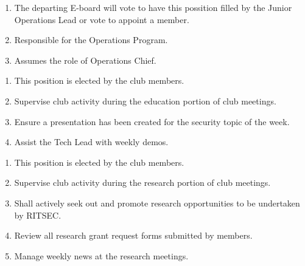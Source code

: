 \begin{enumerate}
	\item The departing E-board will vote to have this possition filled by the Junior Operations Lead or vote to appoint a member.
	\item Responsible for the Operations Program.
	\item Assumes the role of Operations Chief.
\end{enumerate}


\begin{enumerate}
	\item This position is elected by the club members.
	\item Supervise club activity during the education portion of club meetings.
	\item Ensure a presentation has been created for the security topic of the week.
	\item Assist the Tech Lead with weekly demos.
\end{enumerate}


\begin{enumerate}
	\item This position is elected by the club members.
	\item Supervise club activity during the research portion of club meetings.
	\item Shall actively seek out and promote research opportunities to be undertaken by
	      RITSEC.
	\item Review all research grant request forms submitted by members.
	\item Manage weekly news at the research meetings.
\end{enumerate}
